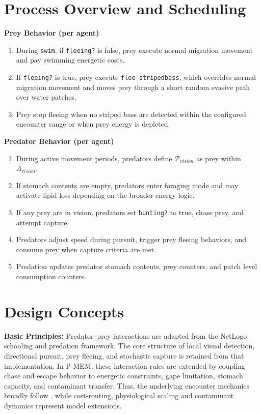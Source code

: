 \documentclass[
]{book}
\begin{document}
\section{Process Overview and Scheduling}\label{process-overview-and-scheduling-11}

\textbf{Prey Behavior (per agent)}

\begin{enumerate}
\def\labelenumi{\arabic{enumi}.}
\item
  During \texttt{swim}, if \texttt{fleeing?} is false, prey execute normal migration
  movement and pay swimming energetic costs.
\item
  If \texttt{fleeing?} is true, prey execute \texttt{flee-stripedbass}, which
  overrides normal migration movement and moves prey through a short
  random evasive path over water patches.
\item
  Prey stop fleeing when no striped bass are detected within the
  configured encounter range or when prey energy is depleted.
\end{enumerate}

\textbf{Predator Behavior (per agent)}

\begin{enumerate}
\def\labelenumi{\arabic{enumi}.}
\item
  During active movement periods, predators define
  \(\mathcal{P}_{vision}\) as prey within \(A_{vision}\).
\item
  If stomach contents are empty, predators enter foraging mode and may
  activate lipid loss depending on the broader energy logic.
\item
  If any prey are in vision, predators set \texttt{hunting?} to true, chase
  prey, and attempt capture.
\item
  Predators adjust speed during pursuit, trigger prey fleeing
  behaviors, and consume prey when capture criteria are met.
\item
  Predation updates predator stomach contents, prey counters, and
  patch level consumption counters.
\end{enumerate}

\section{Design Concepts}\label{design-concepts-11}

\textbf{Basic Principles:} Predator--prey interactions are adapted from the
\citep{dobon_netlogo_2018} NetLogo schooling and predation framework. The
core structure of local visual detection, directional pursuit, prey
fleeing, and stochastic capture is retained from that implementation. In
P-MEM, these interaction rules are extended by coupling chase and escape
behavior to energetic constraints, gape limitation, stomach capacity,
and contaminant transfer. Thus, the underlying encounter mechanics
broadly follow \citet{dobon_netlogo_2018}, while cost-routing, physiological
scaling and contaminant dynamics represent model extensions.
\end{document}

